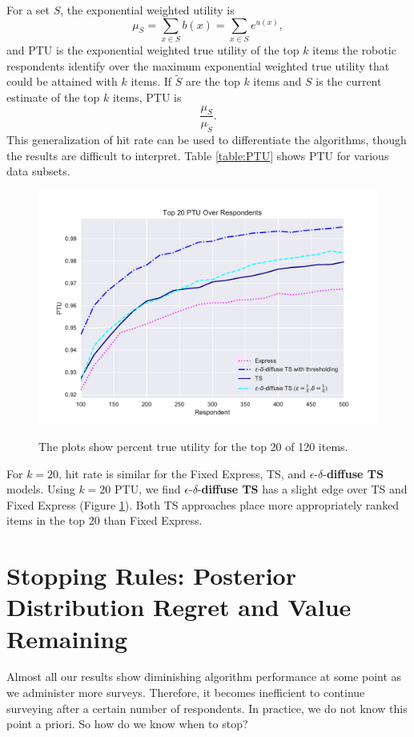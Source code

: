 \documentclass[a4paper,11pt]{article}
\newcommand{\edts}{$\epsilon$-$\delta$-\textbf{diffuse TS} }
\begin{document}
For a set $S$, the exponential weighted utility is \[\mu_S=\sum_{x \in S}b(x)=\sum_{x \in S}e^{u(x)},\]
and PTU is the exponential weighted true utility of the top $k$ items the robotic respondents identify over the maximum exponential weighted true utility that could be attained with $k$ items. If $\tilde{S}$ are the top $k$ items and $S$ is the current estimate of the top $k$ items, PTU is 
\[
\frac{\mu_S}{\mu_{\tilde{S}}}.
\]
This generalization of hit rate can be used to differentiate the algorithms, though the results are difficult to interpret. Table \ref{table:PTU} shows PTU for various data subsets.
\begin{figure}
\caption{The plots show percent true utility for the top 20 of 120 items.}
\includegraphics[width=1\textwidth]{plots/PTU120v20k20.pdf}
\label{fig:20util}
\end{figure}
For $k=20$, hit rate is similar for the Fixed Express, TS, and \edts models. Using $k=20$ PTU, we find \edts has a slight edge over TS and Fixed Express (Figure \ref{fig:20util}). Both TS approaches place more appropriately ranked items in the top 20 than Fixed Express.

\section{Stopping Rules: Posterior Distribution Regret and Value Remaining}

Almost all our results show diminishing algorithm performance at some point as we administer more surveys. Therefore, it becomes inefficient to continue surveying after a certain number of respondents. In practice, we do not know this point a priori. So how do we know when to stop?
\end{document}
